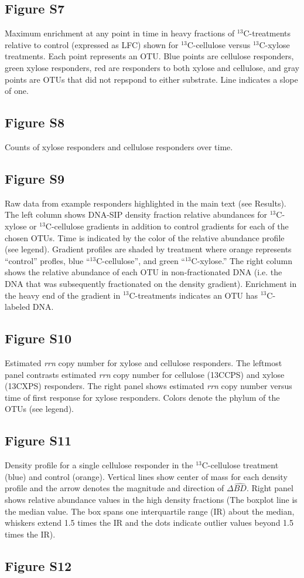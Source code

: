 \subsection{Figure S7}
Maximum enrichment at any point in time in heavy fractions of $^{13}$C-treatments relative to control (expressed as LFC) shown for $^{13}$C-cellulose versus $^{13}$C-xylose treatments. Each point represents an OTU. Blue points are cellulose responders, green xylose responders, red are responders to both xylose and cellulose, and gray points are OTUs that did not repspond to either substrate. Line indicates a slope of one. \subsection{Figure S8}
Counts of xylose responders and cellulose responders over time. \subsection{Figure S9}
Raw data from example responders highlighted in the main text (see Results). The left column shows DNA-SIP density fraction relative abundances for $^{13}$C-xylose or $^{13}$C-cellulose gradients in addition to control gradients for each of the chosen OTUs. Time is indicated by the color of the relative abundance profile (see legend). Gradient profiles are shaded by treatment where orange represents ``control'' profles, blue ``$^{13}$C-cellulose'', and green ``$^{13}$C-xylose.'' The right column shows the relative abundance of each OTU in non-fractionated DNA (i.e. the DNA that was subsequently fractionated on the density gradient). Enrichment in the heavy end of the gradient in $^{13}$C-treatments indicates an OTU has $^{13}$C-labeled DNA. \subsection{Figure S10}
Estimated \textit{rrn} copy number for xylose and cellulose responders. The leftmost panel contrasts estimated \textit{rrn} copy number for cellulose (13CCPS) and xylose (13CXPS) responders. The right panel shows estimated \textit{rrn} copy number versus time of first response for xylose responders. Colors denote the phylum of the OTUs (see legend).  \subsection{Figure S11}
Density profile for a single cellulose responder in the $^{13}$C-cellulose treatment (blue) and control (orange). Vertical lines show center of mass for each density profile and the arrow denotes the magnitude and direction of $\Delta\hat{BD}$. Right panel shows relative abundance values in the high density fractions (The boxplot line is the median value. The box spans one interquartile range (IR) about the median, whiskers extend 1.5 times the IR and the dots indicate outlier values beyond 1.5 times the IR).   \subsection{Figure S12}

